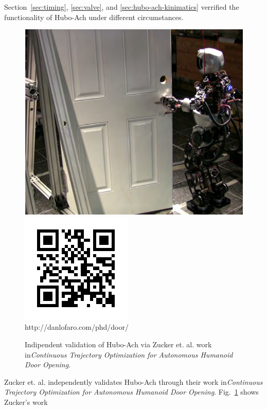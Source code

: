 Section~\ref{sec:timing}, \ref{sec:valve}, and \ref{sec:hubo-ach-kinimatics} verrified the functionality of Hubo-Ach under different circumstances.

\begin{figure}[thpb]
  \centering
      \includegraphics[width=0.69\columnwidth]{./pix/hubo-door.png}\includegraphics[width=0.3\columnwidth]{./qrcode/qrcode-door.png}\\
http://danlofaro.com/phd/door/
      
\caption{Indipendent validation of Hubo-Ach via Zucker et. al.\cite{tepraDoor2013} work in\textit{Continuous Trajectory Optimization for Autonomous Humanoid Door Opening}.}
\label{fig:hubo-ach-door-open}
\end{figure}

Zucker et. al.\cite{tepraDoor2013} independently validates Hubo-Ach through their work in\textit{Continuous Trajectory Optimization for Autonomous Humanoid Door Opening}.
Fig.~\ref{fig:hubo-ach-door-open} shows Zucker's work


